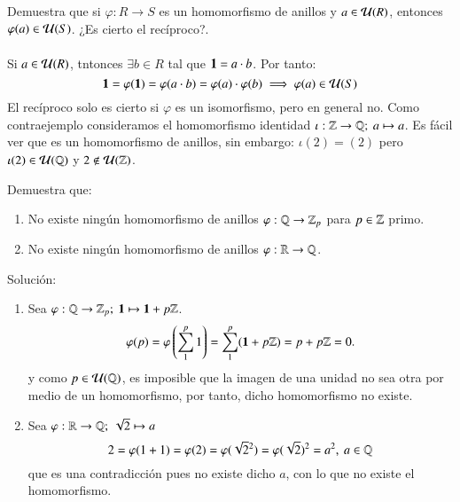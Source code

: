 \begin{ex}[H1.14]
    Demuestra que si $\varphi: R \to S$ es un homomorfismo de anillos y $a \in \mathcal{U}(R)$, entonces $\varphi(a) \in \mathcal{U}(S)$. ¿Es cierto el recíproco?.\\\\
    Si $a \in \mathcal{U}(R)$, tntonces $\exists b \in R$ tal que $\mathbf{1} = a\cdot b$. Por tanto:
    $$
        \mathbf{1} = \varphi(\mathbf{1}) = \varphi(a \cdot b) = \varphi(a) \cdot \varphi(b) \implies \varphi(a) \in \mathcal{U}(S)
    $$
    El recíproco solo es cierto si $\varphi$ es un isomorfismo, pero en general no. Como contraejemplo consideramos el homomorfismo identidad $\iota : \Z \to \Q;\ a \mapsto a$. Es fácil ver que es un homomorfismo de anillos, sin embargo: $\iota(2) = (2)$ pero $\iota(2) \in \mathcal{U}(\mathbb{Q})$ y $2 \notin \mathcal{U}(\mathbb{Z})$.
\end{ex}

\begin{ex}[H1.16]
    Demuestra que:
    \begin{enumerate}
        \item No existe ningún homomorfismo de anillos $\varphi: \mathbb{Q} \to \mathbb{Z}_p$ para $p \in \mathbb{Z}$ primo.
        \item No existe ningún homomorfismo de anillos $\varphi: \mathbb{R} \to \mathbb{Q}$.
    \end{enumerate}
    Solución:
    \begin{enumerate}
        \item Sea $\varphi: \mathbb{Q} \to \mathbb{Z}_p;\ \mathbf{1} \mapsto \mathbf{1} + p\mathbb{Z}$.
        $$
            \varphi(p) = \varphi\left(\sum_1^p 1 \right) = \sum_1^p (\mathbf{1} + p\mathbb{Z}) = p + p\mathbb{Z} = 0.
        $$
        y como $p \in \mathcal{U}(\mathbb{Q})$, es imposible que la imagen de una unidad no sea otra por medio de un homomorfismo, por tanto, dicho homomorfismo no existe.
        \item Sea $\varphi: \mathbb{R} \to \mathbb{Q};\ \sqrt{2} \mapsto a$
        $$
            2 = \varphi(1 + 1) = \varphi(2) = \varphi(\sqrt{2}^2) = \varphi(\sqrt{2})^2 = a^2,\ a \in \mathbb{Q}
        $$
        que es una contradicción pues no existe dicho $a$, con lo que no existe el homomorfismo.
    \end{enumerate}
\end{ex}

